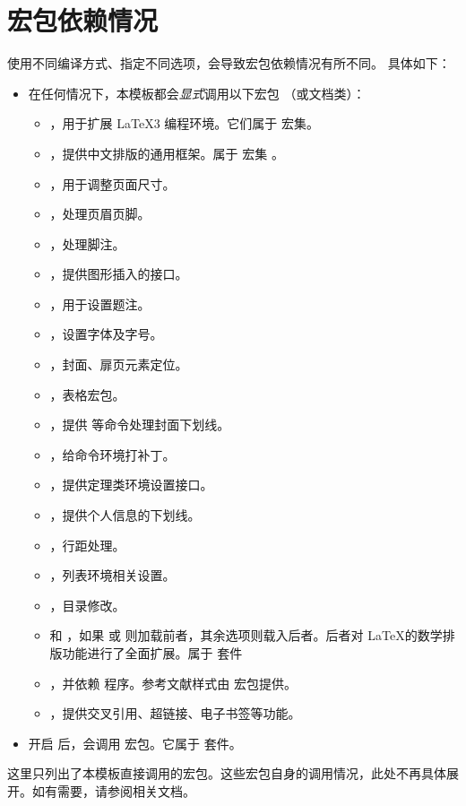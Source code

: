 
\section{宏包依赖情况}

使用不同编译方式、指定不同选项，会导致宏包依赖情况有所不同。
具体如下：
\begin{itemize}
  \item 在任何情况下，本模板都会\emph{显式}调用以下宏包
    （或文档类）：
    \begin{itemize}
      \item {}，用于扩展 \LaTeX3 编程环境。它们属于  宏集。
      \item {}，提供中文排版的通用框架。属于 \CTeX{} 宏集 。
      \item {}，用于调整页面尺寸。
      \item {}，处理页眉页脚。
      \item {}，处理脚注。
      \item {}，提供图形插入的接口。
      \item {}，用于设置题注。
      \item {}，设置字体及字号。
      \item {}，封面、扉页元素定位。
      \item {}，表格宏包。
      \item {}，提供  等命令处理封面下划线。
      \item {}，给命令环境打补丁。
      \item {}，提供定理类环境设置接口。
      \item {}，提供个人信息的下划线。
      \item {}，行距处理。
      \item {}，列表环境相关设置。
      \item {}，目录修改。
      \item {} 和 ，如果  或  则加载前者，其余选项则载入后者。后者对 \LaTeX 的数学排版功能进行了全面扩展。属于 \AmSLaTeX 套件
      \item  {}，并依赖 \biber{} 程序。参考文献样式由 宏包提供。
      \item {}，提供交叉引用、超链接、电子书签等功能。
    \end{itemize}
  \item 开启  后，会调用
     宏包。它属于  套件。
\end{itemize}

这里只列出了本模板直接调用的宏包。这些宏包自身的调用情况，此处不再具体展开。如有需要，请参阅相关文档。
